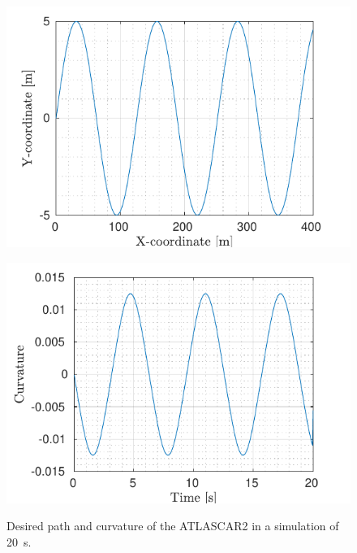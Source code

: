 \begin{figure}[!h]
	\centering
	\begin{minipage}[t]{0.49\textwidth}
		\includegraphics[width=\textwidth]{../../MATLAB/lane_following/figure/Reference.pdf}
		\subcaption{}
		\label{fig:reference_laneFollowing}
	\end{minipage}
	\begin{minipage}[t]{0.49\textwidth}
		\includegraphics[width=\textwidth]{../../MATLAB/lane_following/figure/Curvature.pdf}
		\subcaption{}
		\label{fig:curvature_laneFollowing}
	\end{minipage}
	\caption{Desired path and curvature of the ATLASCAR2 in a simulation of \SI{20}{s}.}
	\label{fig:laneFollowing_desired}
\end{figure}

